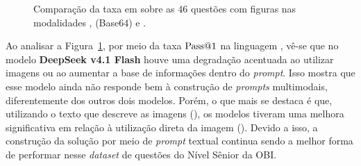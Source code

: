 \begin{figure}[!htbp]
\centering

\caption[Pass@1 em C++ nas três modalidades da PP2]{Comparação da taxa  em  sobre as $46$ questões com figuras nas modalidades ,  (Base64) e .}
\label{fig:res-pp2-modalidades}
\end{figure}
\FloatBarrier

Ao analisar a Figura~\ref{fig:res-pp2-modalidades}, por meio da taxa $\mathrm{Pass@}1$ na linguagem , vê-se que no modelo \textbf{DeepSeek v4.1 Flash} houve uma degradação acentuada ao utilizar imagens ou ao aumentar a base de informações dentro do \textit{prompt}. Isso mostra que esse modelo ainda não responde bem à construção de \textit{prompts} multimodais, diferentemente dos outros dois modelos. Porém, o que mais se destaca é que, utilizando o texto que descreve as imagens (), os modelos tiveram uma melhora significativa em relação à utilização direta da imagem (). Devido a isso, a construção da solução por meio de \textit{prompt} textual continua sendo a melhor forma de performar nesse \textit{dataset} de questões do Nível Sênior da OBI.


